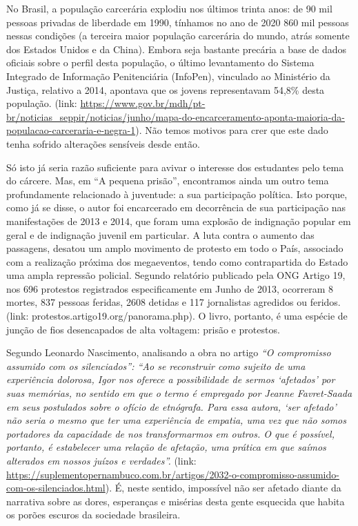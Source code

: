 \documentclass[11pt]{extarticle}
\begin{document}
No Brasil, a população carcerária explodiu nos últimos trinta anos: de
90 mil pessoas privadas de liberdade em 1990, tínhamos no ano de 2020
860 mil pessoas nessas condições (a terceira maior população carcerária
do mundo, atrás somente dos Estados Unidos e da China). Embora seja
bastante precária a base de dados oficiais sobre o perfil desta
população, o último levantamento do Sistema Integrado de Informação
Penitenciária (InfoPen), vinculado ao Ministério da Justiça, relativo a
2014, apontava que os jovens representavam 54,8\% desta população.
(link:
\href{gov.br}{{https://www.gov.br/mdh/pt-br/noticias\_seppir/noticias/junho/mapa-do-encarceramento-aponta-maioria-da-populacao-carceraria-e-negra-1}}).
Não temos motivos para crer que este dado tenha sofrido alterações
sensíveis desde então.

Só isto já seria razão suficiente para avivar o interesse dos estudantes
pelo tema do cárcere. Mas, em ``A pequena prisão'', encontramos ainda um
outro tema profundamente relacionado à juventude: a sua participação
política. Isto porque, como já se disse, o autor foi encarcerado em
decorrência de sua participação nas manifestações de 2013 e 2014, que
foram uma explosão de indignação popular em geral e de indignação
juvenil em particular. A luta contra o aumento das passagens, desatou um
amplo movimento de protesto em todo o País, associado com a realização
próxima dos megaeventos, tendo como contrapartida do Estado uma ampla
repressão policial. Segundo relatório publicado pela ONG Artigo 19, nos
696 protestos registrados especificamente em Junho de 2013, ocorreram 8
mortes, 837 pessoas feridas, 2608 detidas e 117 jornalistas agredidos ou
feridos. (link: protestos.artigo19.org/panorama.php). O livro, portanto,
é uma espécie de junção de fios desencapados de alta voltagem: prisão e
protestos.

Segundo Leonardo Nascimento, analisando a obra no artigo \emph{``O
compromisso assumido com os silenciados'': ``Ao se reconstruir como
sujeito de uma experiência dolorosa, Igor nos oferece a possibilidade de
sermos `afetados' por suas memórias, no sentido em que o termo é
empregado por Jeanne Favret-Saada em seus postulados sobre o ofício de
etnógrafa. Para essa autora, `ser afetado' não seria o mesmo que ter uma
experiência de empatia, uma vez que não somos portadores da capacidade
de nos transformarmos em outros. O que é possível, portanto, é
estabelecer uma relação de afetação, uma prática em que saímos alterados
em nossos juízos e verdades''.} (link:
\href{suplementopernambuco.com.br}{{https://suplementopernambuco.com.br/artigos/2032-o-compromisso-assumido-com-os-silenciados.html}}).
É, neste sentido, impossível não ser afetado diante da narrativa sobre
as dores, esperanças e misérias desta gente esquecida que habita os
porões escuros da sociedade brasileira.
\end{document}
